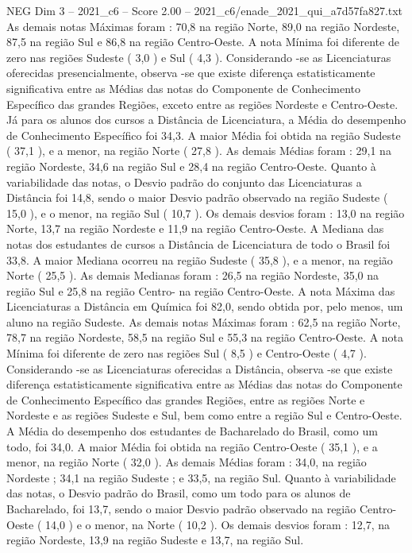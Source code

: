 \begin{textsample}{NEG Dim 3 – 2021\_c6 – Score 2.00 – 2021\_c6/enade\_2021\_qui\_a7d57fa827.txt}
As demais notas Máximas foram : 70,8 na região Norte, 89,0 na região Nordeste, 87,5 na região Sul e 86,8 na região Centro-Oeste.
A nota Mínima foi diferente de zero nas regiões Sudeste ( 3,0 ) e Sul ( 4,3 ).
Considerando -se as Licenciaturas oferecidas presencialmente, observa -se que existe diferença estatisticamente significativa entre as Médias das notas do Componente de Conhecimento Específico das grandes Regiões, exceto entre as regiões Nordeste e Centro-Oeste.
Já para os alunos dos cursos a Distância de Licenciatura, a Média do desempenho de Conhecimento Específico foi 34,3.
A maior Média foi obtida na região Sudeste ( 37,1 ), e a menor, na região Norte ( 27,8 ).
As demais Médias foram : 29,1 na região Nordeste, 34,6 na região Sul e 28,4 na região Centro-Oeste.
Quanto à variabilidade das notas, o Desvio padrão do conjunto das Licenciaturas a Distância foi 14,8, sendo o maior Desvio padrão observado na região Sudeste ( 15,0 ), e o menor, na região Sul ( 10,7 ).
Os demais desvios foram : 13,0 na região Norte, 13,7 na região Nordeste e 11,9 na região Centro-Oeste.
A Mediana das notas dos estudantes de cursos a Distância de Licenciatura de todo o Brasil foi 33,8.
A maior Mediana ocorreu na região Sudeste ( 35,8 ), e a menor, na região Norte ( 25,5 ).
As demais Medianas foram : 26,5 na região Nordeste, 35,0 na região Sul e 25,8 na região Centro- na região Centro-Oeste.
A nota Máxima das Licenciaturas a Distância em Química foi 82,0, sendo obtida por, pelo menos, um aluno na região Sudeste.
As demais notas Máximas foram : 62,5 na região Norte, 78,7 na região Nordeste, 58,5 na região Sul e 55,3 na região Centro-Oeste.
A nota Mínima foi diferente de zero nas regiões Sul ( 8,5 ) e Centro-Oeste ( 4,7 ).
Considerando -se as Licenciaturas oferecidas a Distância, observa -se que existe diferença estatisticamente significativa entre as Médias das notas do Componente de Conhecimento Específico das grandes Regiões, entre as regiões Norte e Nordeste e as regiões Sudeste e Sul, bem como entre a região Sul e Centro-Oeste.
A Média do desempenho dos estudantes de Bacharelado do Brasil, como um todo, foi 34,0.
A maior Média foi obtida na região Centro-Oeste ( 35,1 ), e a menor, na região Norte ( 32,0 ).
As demais Médias foram : 34,0, na região Nordeste ; 34,1 na região Sudeste ; e 33,5, na região Sul.
Quanto à variabilidade das notas, o Desvio padrão do Brasil, como um todo para os alunos de Bacharelado, foi 13,7, sendo o maior Desvio padrão observado na região Centro-Oeste ( 14,0 ) e o menor, na Norte ( 10,2 ).
Os demais desvios foram : 12,7, na região Nordeste, 13,9 na região Sudeste e 13,7, na região Sul.

\end{textsample}
